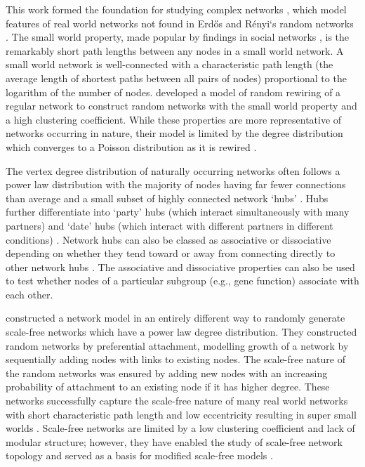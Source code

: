This work formed the foundation for studying complex networks \citep{vanSteen2010}, which model features of real world networks not found in Erd\H{o}s and R\'enyi`s random networks \citep{Erdos1959, Erdos1960}. The small world property, made popular by findings in social networks \citep{Travers1969}, is the remarkably short path lengths between any nodes in a small world network. A small world network is well-connected with a characteristic path length (the average length of shortest paths between all pairs of nodes) proportional to the logarithm of the number of nodes. \citet{Watts1998} developed a model of random rewiring of a regular network to construct random networks with the small world property and a high clustering coefficient. While these properties are more representative of networks occurring in nature, their model is limited by the degree distribution which converges to a Poisson distribution as it is rewired \citet{Barrat2000}. 

The vertex degree distribution of naturally occurring networks often follows a power law distribution with the majority of nodes having far fewer connections than average and a small subset of highly connected network `hubs' \citet{Barabasi1999}. Hubs further differentiate into `party' hubs (which interact simultaneously with many partners) and `date' hubs (which interact with different partners in different conditions) \citet{Han2004}. Network hubs can also be classed as associative or dissociative depending on whether they tend toward or away from connecting directly to other network hubs \citep{vanSteen2010}. The associative and dissociative properties can also be used to test whether nodes of a particular subgroup (e.g., gene function) associate with each other. 

\citet{Barabasi1999} constructed a network model in an entirely different way to randomly generate scale-free networks which have a power law degree distribution. They constructed random networks by preferential attachment, modelling growth of a network by sequentially adding nodes with links to existing nodes. The scale-free nature of the random networks was ensured by adding new nodes with an increasing probability of attachment to an existing node if it has higher degree. These networks successfully capture the scale-free nature of many real world networks with short characteristic path length and low eccentricity resulting in super small worlds \citet{Barabasi1999}. Scale-free networks are limited by a low clustering coefficient and lack of modular structure; however, they have enabled the study of scale-free network topology and served as a basis for modified scale-free models \citep{Dorogovtsev2003, Holme2002}. 

